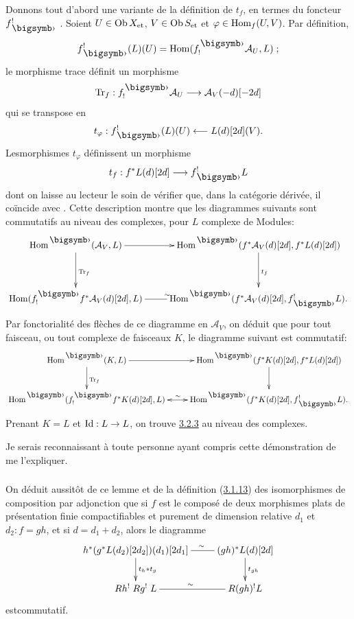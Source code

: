 \documentclass[10pt]{../fichiers-configuration-latex/smfart}
\begin{document}
Donnons tout d'abord une variante de la définition de $t_f$, en termes
du foncteur $f^!_\bigdot$ .
Soient $U\in \operatorname{Ob} X_{\text{\rm et}}$,
$V\in \operatorname{Ob} S_{\text{\rm et}}$ et $\varphi\in \operatorname{Hom}_{f}(U,V)$. Par
définition,
$$
f^{!}_{\bigdot}(L)(U)=\Hom(f^{\bigdot}_{!}\mathcal{A}_{U},L){\quoi}\;;
$$
le morphisme trace définit un morphisme
$$
\Tr_{f}:f^{\bigdot}_{!}\mathcal{A}_{U}\longrightarrow
\mathcal{A}_{V}(-d)[-2d]
$$
qui se transpose en
$$
t_{\varphi}:f^{!}_{\bigdot}(L)(U)\longleftarrow L(d)[2d](V){\quoi}.
$$
Les\pageoriginale morphismes $t_{\varphi}$ définissent un morphisme
$$
t_{f}:f^{\ast}L(d)[2d]\longrightarrow f^{!}_{\bigdot}L
$$
dont on laisse au lecteur le soin de vérifier que, dans la catégorie
dérivée, il coïncide avec . Cette description montre que les
diagrammes suivants sont commutatifs au niveau des complexes, pour $L$
complexe de Modules:
$$
\xymatrix@R=1.25cm{
\Hom^{\bigdot}(\Aa_V,L) \ar[r] \ar[d]^{\Tr_f}& \Hom^{\bigdot}(f^{\ast}\Aa_V(d) [2d], f^{\ast}
L(d) [2d])\ar[d]^{t_f}\\
\Hom(f^{\bigdot}_!f^{\ast}\Aa_V(d)[2d],L) \ar@{-}[r]^{\sim}& \Hom^{\bigdot}(f^{\ast}\Aa_V(d)[2d], f^{!}_{\bigdot}L).
}
$$
Par fonctorialité des flèches de ce diagramme en $\mathcal{A}_{V}$, on
déduit que pour tout faisceau, ou tout complexe de faisceaux $K$, le
diagramme suivant est commutatif:
$$
\xymatrix{
\Hom^{\bigdot}(K,L) \ar[r] \ar[d]^{\Tr_f}& \Hom^{\bigdot}(f^{\ast}K(d)[2d],
f^{\ast}L(d)[2d]) \ar[d]\\
\Hom^{\bigdot}(f^{\bigdot}_!f^{\ast}K(d)[2d],L) \ar@{<->}[r]^{\sim} &\Hom^{\bigdot}(f^{\ast}K(d)[2d], f^{!}_{\bigdot}L).
}
$$
Prenant $K=L$ et $\operatorname{Id}:L\rightarrow L$, on trouve \hyperref[XVIII.lem3.2.3]{3.2.3}
au niveau des complexes.

Je serais reconnaissant à toute personne ayant compris cette
démonstration de me l'expliquer.

\setcounter{subsubsection}{3}
\subsubsection{}
On déduit aussitôt de ce lemme et de la définition
(\hyperref[XVIII.subsubsec3.1.13]{3.1.13}) des 
isomorphismes de composition par adjonction que si $f$ est le composé
de deux morphismes plats de présentation finie compactifiables et
purement de dimension relative $d_{1}$ et $d_{2}:f=gh$, et si
$d=d_{1}+d_{2}$, alors le diagramme
$$
\xymatrix{
h^{\ast}(g^{\ast}L(d_2)[2d_2])(d_1)[2d_1]
\ar@{-}[r]^(.6){\sim}
\ar[d]^{t_h\ast t_g}&(gh)^{\ast}L(d)[2d] \ar[d]^{t_{gh}}\\
Rh^{!} \; Rg^{!} \; L  \ar@{-}[r]^{\sim}&  R(gh)^{!}L
}
$$
est\pageoriginale commutatif.
\end{document}
